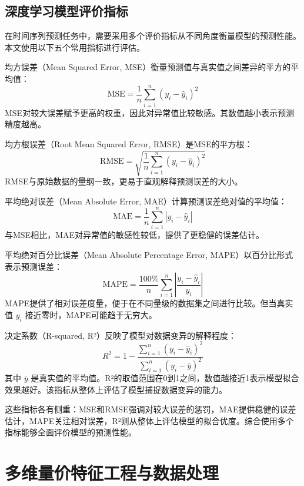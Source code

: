\documentclass[UTF8,AutoFakeBold=1,AutoFakeSlant,zihao=-4]{SCAU}
\begin{document}
\subsection{深度学习模型评价指标}

在时间序列预测任务中，需要采用多个评价指标从不同角度衡量模型的预测性能。本文使用以下五个常用指标进行评估。

均方误差（Mean Squared Error, MSE）衡量预测值与真实值之间差异的平方的平均值：
\begin{equation}
\text{MSE} = \frac{1}{n} \sum_{i=1}^{n} (y_i - \hat{y}_i)^2
\end{equation}
MSE对较大误差赋予更高的权重，因此对异常值比较敏感。其数值越小表示预测精度越高。

均方根误差（Root Mean Squared Error, RMSE）是MSE的平方根：
\begin{equation}
\text{RMSE} = \sqrt{\frac{1}{n} \sum_{i=1}^{n} (y_i - \hat{y}_i)^2}
\end{equation}
RMSE与原始数据的量纲一致，更易于直观解释预测误差的大小。

平均绝对误差（Mean Absolute Error, MAE）计算预测误差绝对值的平均值：
\begin{equation}
\text{MAE} = \frac{1}{n} \sum_{i=1}^{n} |y_i - \hat{y}_i|
\end{equation}
与MSE相比，MAE对异常值的敏感性较低，提供了更稳健的误差估计。

平均绝对百分比误差（Mean Absolute Percentage Error, MAPE）以百分比形式表示预测误差：
\begin{equation}
\text{MAPE} = \frac{100\%}{n} \sum_{i=1}^{n} \left|\frac{y_i - \hat{y}_i}{y_i}\right|
\end{equation}
MAPE提供了相对误差度量，便于在不同量级的数据集之间进行比较。但当真实值 $y_i$ 接近零时，MAPE可能趋于无穷大。

决定系数（R-squared, R²）反映了模型对数据变异的解释程度：
\begin{equation}
R^2 = 1 - \frac{\sum_{i=1}^{n} (y_i - \hat{y}_i)^2}{\sum_{i=1}^{n} (y_i - \bar{y})^2}
\end{equation}
其中 $\bar{y}$ 是真实值的平均值。R²的取值范围在0到1之间，数值越接近1表示模型拟合效果越好。该指标从整体上评估了模型捕捉数据变异的能力。

这些指标各有侧重：MSE和RMSE强调对较大误差的惩罚，MAE提供稳健的误差估计，MAPE关注相对误差，R²则从整体上评估模型的拟合优度。综合使用多个指标能够全面评价模型的预测性能。


\section{多维量价特征工程与数据处理}
\end{document}
